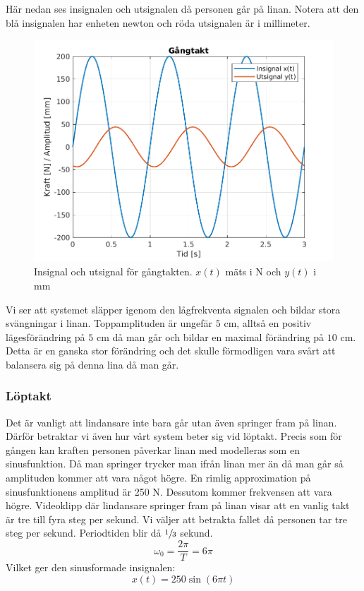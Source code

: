 \newpage
Här nedan ses insignalen och utsignalen då personen går på linan. Notera att den blå insignalen har enheten newton och röda utsignalen är i millimeter. 

\begin{figure}[H]
    \centering
     \includegraphics[scale=0.9]{bilder/sinusfunktion_gangtakt}
    \caption{Insignal och utsignal för gångtakten. $x(t)$ mäts i N och $y(t)$ i mm}
    \label{fig:sinusfunktion_gangtakt}
\end{figure}
Vi ser att systemet släpper igenom den lågfrekventa signalen och bildar stora svängningar i linan. Toppamplituden är ungefär $5$ cm, alltså en positiv  lägesförändring på $5$ cm då man går och bildar en maximal förändring på $10$ cm.
Detta är en ganska stor förändring och det skulle förmodligen vara svårt att balansera sig på denna lina då man går.


\newpage
\subsubsection{Löptakt}
Det är vanligt att lindansare inte bara går utan även springer fram på linan. Därför betraktar vi även hur vårt system beter sig vid löptakt. Precis som för gången kan kraften personen påverkar linan med modelleras som en sinusfunktion. Då man springer trycker man ifrån linan mer än då man går så amplituden kommer att vara något högre. En rimlig approximation på sinusfunktionens amplitud är 250 N. Dessutom kommer frekvensen att vara högre. Videoklipp där lindansare springer fram på linan visar att en vanlig takt är tre till fyra steg per sekund. Vi väljer att betrakta fallet då personen tar tre steg per sekund. Periodtiden blir då $\sfrac{1}{3}$ sekund.
$$\omega_0 = \dfrac{2\pi}{T} = 6\pi$$
Vilket ger den sinusformade insignalen:
$$x(t) = 250\sin(6\pi t)$$

